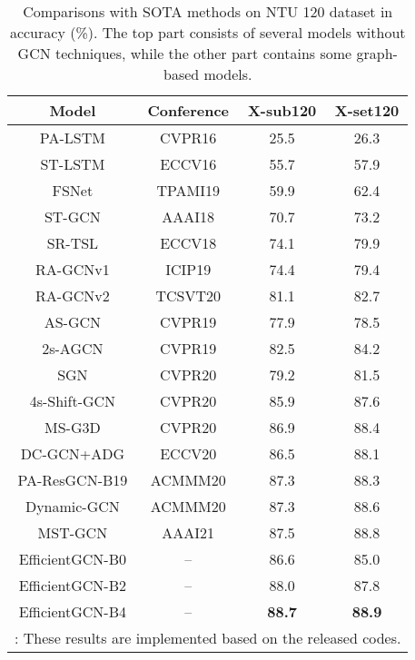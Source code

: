 \documentclass[10pt,journal,compsoc]{IEEEtran}
\begin{document}
\begin{table}[t]
  \caption{Comparisons with SOTA methods on NTU 120 dataset in accuracy (\%). The top part consists of several models without GCN techniques, while the other part contains some graph-based models.}
  \label{tab:ntu120}
  \vspace{-0.4cm}
  \centering
  \setlength{\tabcolsep}{4pt}
  \renewcommand{\arraystretch}{1.2}
  \begin{tabular}{cc|cc}
  \toprule
  Model & Conference & X-sub120 & X-set120 \\
  \midrule
  PA-LSTM \cite{shahroudy2016ntu} & CVPR16 & 25.5 & 26.3 \\
  ST-LSTM \cite{liu2016spatio} & ECCV16 & 55.7 & 57.9 \\
  FSNet \cite{liu2019skeleton} & TPAMI19 & 59.9 & 62.4 \\
  \midrule
  ST-GCN \cite{yan2018spatial} & AAAI18 & 70.7 & 73.2 \\
  SR-TSL \cite{si2018skeleton} & ECCV18 & 74.1 & 79.9 \\
  RA-GCNv1 \cite{song2019richly} & ICIP19 & 74.4 & 79.4 \\
  RA-GCNv2 \cite{song2020richly} & TCSVT20 & 81.1 & 82.7 \\
  AS-GCN \cite{li2019actional} & CVPR19 & 77.9 & 78.5 \\
  2s-AGCN \cite{shi2019two} & CVPR19 & 82.5 & 84.2 \\
  SGN \cite{zhang2020semantics} & CVPR20 & 79.2 & 81.5 \\
  4s-Shift-GCN \cite{cheng2020skeleton} & CVPR20 & 85.9 & 87.6 \\
  MS-G3D \cite{liu2020disentangling} & CVPR20 & 86.9 & 88.4 \\
  DC-GCN+ADG \cite{cheng2020decoupling} & ECCV20 & 86.5 & 88.1 \\
  PA-ResGCN-B19 \cite{song2020stronger} & ACMMM20 & 87.3 & 88.3 \\
  Dynamic-GCN \cite{ye2020dynamic} & ACMMM20 & 87.3 & 88.6 \\
  MST-GCN \cite{chen2021multi} & AAAI21 & 87.5 & 88.8 \\
  \midrule
  EfficientGCN-B0 & -- & 86.6 & 85.0 \\
  EfficientGCN-B2 & -- & 88.0 & 87.8 \\
  EfficientGCN-B4 & -- & {\bf 88.7} & {\bf 88.9} \\
  \bottomrule
  \multicolumn{4}{l}{: These results are implemented based on the released codes.}\\
  \end{tabular}
\end{table}
\end{document}
